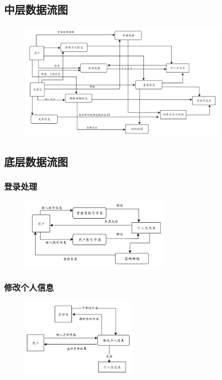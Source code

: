 \documentclass[12pt,a4paper,UTF8]{article}
\begin{document}
\subsection{中层数据流图}

\begin{figure}[H]
  \centering
  \includegraphics[width=0.9\textwidth]{figures/df2.png}
\end{figure}

\subsection{底层数据流图}

\subsubsection{登录处理}

\begin{figure}[H]
  \centering
  \includegraphics[width=0.65\textwidth]{figures/df31.png}
\end{figure}

\subsubsection{修改个人信息}

\begin{figure}[H]
  \centering
  \includegraphics[width=0.5\textwidth]{figures/df32.png}
\end{figure}
\end{document}
